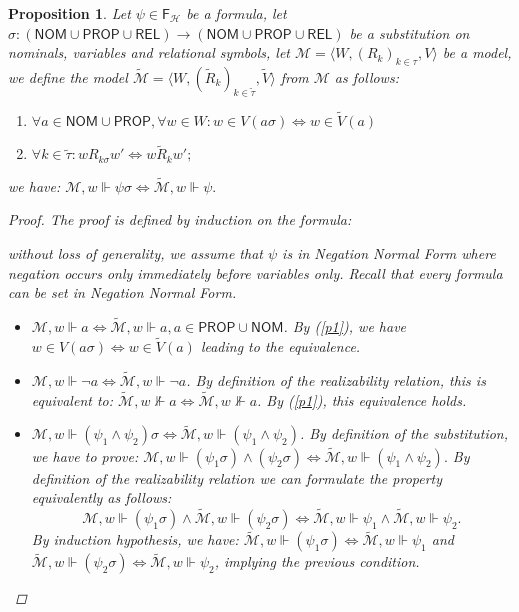 \documentclass{eptcs}
\newcommand{\tuple}[1]{{\langle #1 \rangle}}
\newtheorem{proposition}{Proposition}
\newcounter{ti}
\begin{document}
\begin{proposition}
\label{prop:correct1}
Let $\psi \in \textsf{F}_{\mathcal H}$ be a formula, let $\sigma: (\textsf{NOM} \cup \textsf{PROP} \cup \textsf{REL} ) \to (\textsf{NOM} \cup \textsf{PROP} \cup \textsf{REL})$ be a substitution on nominals, variables and relational symbols, let $\mathcal M=\tuple{W, (R_k)_{k \in \tau}, V}$ be a model, we define the model $\mathcal{\tilde M}=\tuple{W, (\tilde R_{k})_{k \in \tilde \tau}, \tilde V}$ from $\mathcal M$ as follows:

\begin{enumerate}
\item $\forall a \in \textsf{NOM} \cup \textsf{PROP}, \forall w \in W: w \in V(a\sigma) \iff w \in \tilde V(a) $ \label{p1}
\item $\forall k \in \tilde \tau : w R_{k \sigma} w' \iff w \tilde R_{k} w';$ \label{p2}
\end{enumerate}
 we have: $ \mathcal M,w \Vdash \psi \sigma \iff \mathcal{\tilde M},w \Vdash \psi.$

\begin{proof}
The proof is defined by induction on the formula:

without loss of generality, we assume that $\psi$ is in Negation Normal Form where negation occurs only immediately before variables only. Recall that every formula can be set in Negation Normal Form. 
\begin{itemize}
\item $\mathcal{ M},w \Vdash a \iff \mathcal{\tilde M},w \Vdash a, a \in \textsf{PROP} \cup \textsf{NOM} $. By (\ref{p1}), we have $w \in V(a\sigma) \iff w \in \tilde V(a)$ leading to the equivalence.

\item $\mathcal{ M},w \Vdash \neg a \iff \mathcal{\tilde M},w \Vdash \neg a$. By definition of the realizability relation, this is equivalent to: $\mathcal{\tilde M},w \nVdash a \iff \mathcal{\tilde M},w \nVdash a$. By (\ref{p1}), this equivalence holds.

\item $\mathcal{ M},w \Vdash (\psi_1 \land \psi_2)\sigma \iff \mathcal{\tilde M},w \Vdash (\psi_1 \land \psi_2)$. 
 By definition of the substitution, we have to prove:
 $\mathcal{ M},w \Vdash (\psi_1\sigma) \land (\psi_2\sigma) \iff \mathcal{\tilde M},w \Vdash (\psi_1 \land \psi_2).$
By definition of the realizability relation we can formulate the property equivalently as follows: 
 $$\mathcal{ M},w \Vdash (\psi_1\sigma) \land \mathcal{\tilde M},w \Vdash (\psi_2\sigma) \iff \mathcal{\tilde M},w \Vdash \psi_1 \land \mathcal{\tilde M},w \Vdash \psi_2.$$
By induction hypothesis, we have: $\mathcal{\tilde M},w \Vdash (\psi_1\sigma) \iff \mathcal{\tilde M},w \Vdash \psi_1$ and $\mathcal{\tilde M},w \Vdash (\psi_2\sigma) \iff \mathcal{\tilde M},w \Vdash \psi_2$, implying the previous condition.


\end{itemize}
\end{proof}
\end{proposition}
\end{document}
